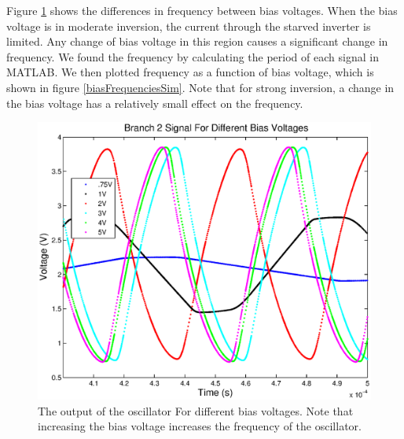 \documentclass{article}
\begin{document}
Figure \ref{branch2DiffBiasSim} shows the differences in frequency between bias voltages. When the bias voltage is in moderate inversion, the current through the starved inverter is limited. Any change of bias voltage in this region causes a significant change in frequency. We found the frequency by calculating the period of each signal in MATLAB. We then plotted frequency as a function of bias voltage, which is shown in figure \ref{biasFrequenciesSim}. Note that for strong inversion, a change in the bias voltage has a relatively small effect on the frequency. 

\begin{figure}[H]
\centering
\includegraphics[scale=.7]{branch2DiffBiasSim.eps}
\caption{The output of the oscillator For different bias voltages. Note that increasing the bias voltage increases the frequency of the oscillator.}
\label{branch2DiffBiasSim}
\end{figure}
\end{document}
